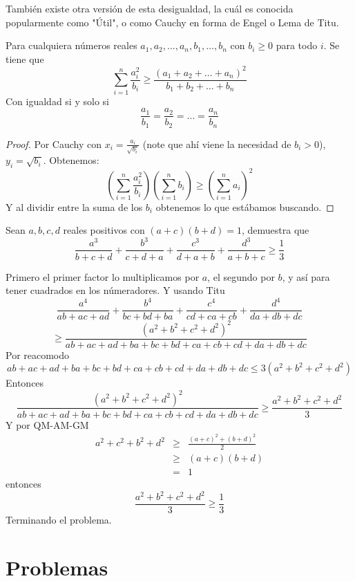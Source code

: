 \documentclass[11pt]{scrartcl}
\begin{document}
\noindent
Tambi\'en existe otra versi\'on de esta desigualdad, la cu\'al es conocida popularmente como "\'Util", o como Cauchy en forma de Engel o Lema de Titu. 
\begin{theorem} [\'Util]
    Para cualquiera n\'umeros reales $a_1,a_2,\ldots, a_n, b_1,\ldots,b_n$ con $b_i \geq 0$ para todo $i$. Se tiene que 
    \[\sum_{i=1}^n \frac{a_i^2}{b_i} \geq \frac{(a_1+a_2+\ldots+a_n)^2}{b_1+b_2+\ldots+b_n}\]
    Con igualdad si y solo si
    \[\frac{a_1}{b_1}=\frac{a_2}{b_2}=\ldots=\frac{a_n}{b_n}\]
\end{theorem}
\begin{proof}
Por Cauchy con $x_i=\frac{a_i}{\sqrt{b_i}}$ (note que ah\'i viene la necesidad de $b_i>0$), $y_i=\sqrt{b_i}$. Obtenemos:
\[\left(\sum_{i=1}^n \frac{a_i^2}{b_i}\right)\left(\sum_{i=1}^n b_i\right) \geq \left(\sum_{i=1}^n a_i\right)^2\]
Y al dividir entre la suma de los $b_i$ obtenemos lo que est\'abamos buscando.
\end{proof}
\begin{example}
    Sean $a,b,c,d$ reales positivos con $(a+c)(b+d)=1$, demuestra que
    \[\frac{a^3}{b+c+d}+\frac{b^3}{c+d+a}+\frac{c^3}{d+a+b}+\frac{d^3}{a+b+c}\geq \frac 13\]
    \label{IMOSL90-24}
\end{example}
\begin{soln}
    Primero el primer factor lo multiplicamos por $a$, el segundo por $b$, y as\'i para tener cuadrados en los n\'umeradores. Y usando Titu
    \[\frac{a^4}{ab+ac+ad}+\frac{b^4}{bc+bd+ba}+\frac{c^4}{cd+ca+cb}+\frac{d^4}{da+db+dc}\]\[\geq \frac{(a^2+b^2+c^2+d^2)^2}{ab+ac+ad+ba+bc+bd+ca+cb+cd+da+db+dc}\]
    Por reacomodo 
    \[ab+ac+ad+ba+bc+bd+ca+cb+cd+da+db+dc\leq 3(a^2+b^2+c^2+d^2)\]
    Entonces 
    \[\frac{(a^2+b^2+c^2+d^2)^2}{ab+ac+ad+ba+bc+bd+ca+cb+cd+da+db+dc} \geq \frac{a^2+b^2+c^2+d^2}{3}\]
    Y por QM-AM-GM
    \begin{eqnarray*}
        a^2+c^2+b^2+d^2 &\geq& \frac{(a+c)^2+(b+d)^2}{2} \\
        &\geq& (a+c)(b+d)\\
        &=& 1
    \end{eqnarray*}
    entonces 
    \[\frac{a^2+b^2+c^2+d^2}{3}\geq \frac 13\]
    Terminando el problema.
\end{soln}
\newpage
\section{Problemas}
\end{document}
